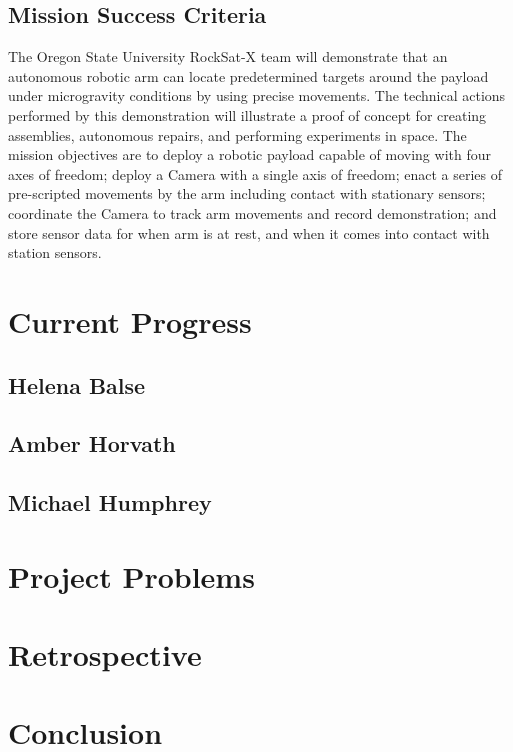 \documentclass[letterpaper,10pt]{article}
\begin{document}
\subsection{Mission Success Criteria}
The Oregon State University RockSat-X team will demonstrate that an autonomous robotic arm can locate predetermined targets around the 
payload under microgravity conditions by using precise movements. The technical actions performed by this demonstration will illustrate 
a proof of concept for creating assemblies, autonomous repairs, and performing experiments in space. 
The mission objectives are to deploy a robotic payload capable of moving with four axes of freedom; deploy a Camera with a single axis 
of freedom;
enact a series of pre-scripted movements by the arm including contact with stationary sensors;
coordinate the Camera to track arm movements and record demonstration; and
store sensor data for when arm is at rest, and when it comes into contact with station sensors.

\section{Current Progress}
\subsection{Helena Balse}

\subsection{Amber Horvath}
\subsection{Michael Humphrey}

\section{Project Problems}
\section{Retrospective}


\section{Conclusion}
\end{document}
